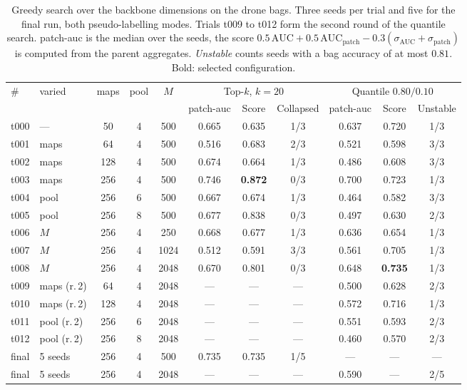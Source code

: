 \documentclass[12pt,parskip = half, DIV=classic,listof=totoc]{scrartcl}
\begin{document}
			\begin{table}[htbp]
				\centering
				\scriptsize
				\setlength{\tabcolsep}{3.5pt}
				\begin{tabular}{@{}llccccccccc@{}}
					\toprule
					\multirow{2}{*}{\#} & \multirow{2}{*}{varied} & \multirow{2}{*}{maps} & \multirow{2}{*}{pool} & \multirow{2}{*}{$M$} & \multicolumn{3}{c}{Top-$k$, $k=20$} & \multicolumn{3}{c}{Quantile $0.80/0.10$} \\
					\cmidrule(lr){6-8}\cmidrule(l){9-11}
					& & & & & patch-\acs*{auc} & Score & Collapsed & patch-\acs*{auc} & Score & Unstable \\
					\midrule
					t000 & --- & 50 & 4 & 500 & 0.665 & 0.635 & 1/3 & 0.637 & 0.720 & 1/3 \\
					\midrule
					t001 & maps & 64 & 4 & 500 & 0.516 & 0.683 & 2/3 & 0.521 & 0.598 & 3/3 \\
					t002 & maps & 128 & 4 & 500 & 0.674 & 0.664 & 1/3 & 0.486 & 0.608 & 3/3 \\
					t003 & maps & 256 & 4 & 500 & 0.746 & \textbf{0.872} & 0/3 & 0.700 & 0.723 & 1/3 \\
					\midrule
					t004 & pool & 256 & 6 & 500 & 0.667 & 0.674 & 1/3 & 0.464 & 0.582 & 3/3 \\
					t005 & pool & 256 & 8 & 500 & 0.677 & 0.838 & 0/3 & 0.497 & 0.630 & 2/3 \\
					\midrule
					t006 & $M$ & 256 & 4 & 250 & 0.668 & 0.677 & 1/3 & 0.636 & 0.654 & 1/3 \\
					t007 & $M$ & 256 & 4 & 1024 & 0.512 & 0.591 & 3/3 & 0.561 & 0.705 & 1/3 \\
					t008 & $M$ & 256 & 4 & 2048 & 0.670 & 0.801 & 0/3 & 0.648 & \textbf{0.735} & 1/3 \\
					\midrule
					t009 & maps (r.\,2) & 64 & 4 & 2048 & --- & --- & --- & 0.500 & 0.628 & 2/3 \\
					t010 & maps (r.\,2) & 128 & 4 & 2048 & --- & --- & --- & 0.572 & 0.716 & 1/3 \\
					t011 & pool (r.\,2) & 256 & 6 & 2048 & --- & --- & --- & 0.551 & 0.593 & 2/3 \\
					t012 & pool (r.\,2) & 256 & 8 & 2048 & --- & --- & --- & 0.460 & 0.570 & 2/3 \\
					\midrule
					final & 5 seeds & 256 & 4 & 500 & 0.735 & 0.735 & 1/5 & --- & --- & --- \\
					final & 5 seeds& 256 & 4 & 2048 & --- & --- & --- & 0.590 & --- & 2/5 \\
					\bottomrule
				\end{tabular}
				\caption{Greedy search over the backbone dimensions on the drone bags. Three seeds per trial and
				five for the final run, both pseudo-labelling modes. Trials t009 to t012 form the second round of the
				quantile search. patch-\acs*{auc} is the median over the seeds, the score
				$0.5\,\mathrm{AUC} + 0.5\,\mathrm{AUC}_{\text{patch}} - 0.3(\sigma_{\mathrm{AUC}} + \sigma_{\text{patch}})$ is
				computed from the parent aggregates. \emph{Unstable} counts seeds with a bag accuracy of at most $0.81$.
				Bold: selected configuration.}
				\label{tab:drone_greedy}
			\end{table}
\end{document}

